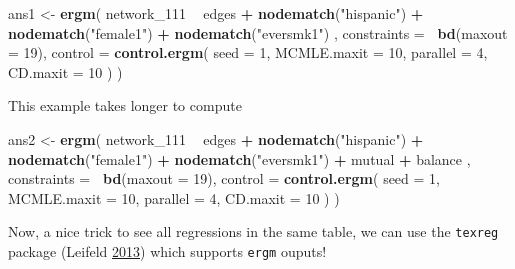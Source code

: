 \documentclass[]{book}
\newenvironment{Shaded}{\begin{snugshade}}{\end{snugshade}}
\newcommand{\KeywordTok}[1]{\textcolor[rgb]{0.13,0.29,0.53}{\textbf{#1}}}
\newcommand{\DataTypeTok}[1]{\textcolor[rgb]{0.13,0.29,0.53}{#1}}
\newcommand{\DecValTok}[1]{\textcolor[rgb]{0.00,0.00,0.81}{#1}}
\newcommand{\StringTok}[1]{\textcolor[rgb]{0.31,0.60,0.02}{#1}}
\newcommand{\OperatorTok}[1]{\textcolor[rgb]{0.81,0.36,0.00}{\textbf{#1}}}
\newcommand{\NormalTok}[1]{#1}
\theoremstyle{definition}
\theoremstyle{definition}
\theoremstyle{definition}
\theoremstyle{remark}
\begin{document}
\begin{Shaded}
\begin{Highlighting}[]
\NormalTok{ans1 <-}\StringTok{ }\KeywordTok{ergm}\NormalTok{(}
\NormalTok{  network_}\DecValTok{111} \OperatorTok{~}
\StringTok{    }\NormalTok{edges }\OperatorTok{+}
\StringTok{    }\KeywordTok{nodematch}\NormalTok{(}\StringTok{"hispanic"}\NormalTok{) }\OperatorTok{+}
\StringTok{    }\KeywordTok{nodematch}\NormalTok{(}\StringTok{"female1"}\NormalTok{) }\OperatorTok{+}
\StringTok{    }\KeywordTok{nodematch}\NormalTok{(}\StringTok{"eversmk1"}\NormalTok{)}
\NormalTok{    ,}
  \DataTypeTok{constraints =} \OperatorTok{~}\KeywordTok{bd}\NormalTok{(}\DataTypeTok{maxout =} \DecValTok{19}\NormalTok{),}
  \DataTypeTok{control =} \KeywordTok{control.ergm}\NormalTok{(}
    \DataTypeTok{seed        =} \DecValTok{1}\NormalTok{,}
    \DataTypeTok{MCMLE.maxit =} \DecValTok{10}\NormalTok{,}
    \DataTypeTok{parallel    =} \DecValTok{4}\NormalTok{,}
    \DataTypeTok{CD.maxit    =} \DecValTok{10}
\NormalTok{    )}
\NormalTok{  )}
\end{Highlighting}
\end{Shaded}

This example takes longer to compute

\begin{Shaded}
\begin{Highlighting}[]
\NormalTok{ans2 <-}\StringTok{ }\KeywordTok{ergm}\NormalTok{(}
\NormalTok{  network_}\DecValTok{111} \OperatorTok{~}
\StringTok{    }\NormalTok{edges }\OperatorTok{+}
\StringTok{    }\KeywordTok{nodematch}\NormalTok{(}\StringTok{"hispanic"}\NormalTok{) }\OperatorTok{+}
\StringTok{    }\KeywordTok{nodematch}\NormalTok{(}\StringTok{"female1"}\NormalTok{) }\OperatorTok{+}
\StringTok{    }\KeywordTok{nodematch}\NormalTok{(}\StringTok{"eversmk1"}\NormalTok{) }\OperatorTok{+}\StringTok{ }
\StringTok{    }\NormalTok{mutual }\OperatorTok{+}
\StringTok{    }\NormalTok{balance}
\NormalTok{    ,}
  \DataTypeTok{constraints =} \OperatorTok{~}\KeywordTok{bd}\NormalTok{(}\DataTypeTok{maxout =} \DecValTok{19}\NormalTok{),}
  \DataTypeTok{control =} \KeywordTok{control.ergm}\NormalTok{(}
    \DataTypeTok{seed        =} \DecValTok{1}\NormalTok{,}
    \DataTypeTok{MCMLE.maxit =} \DecValTok{10}\NormalTok{,}
    \DataTypeTok{parallel    =} \DecValTok{4}\NormalTok{,}
    \DataTypeTok{CD.maxit    =} \DecValTok{10}
\NormalTok{    )}
\NormalTok{  )}
\end{Highlighting}
\end{Shaded}

Now, a nice trick to see all regressions in the same table, we can use
the \texttt{texreg} package (Leifeld
\protect\hyperlink{ref-R-texreg}{2013}) which supports \texttt{ergm}
ouputs!
\end{document}
